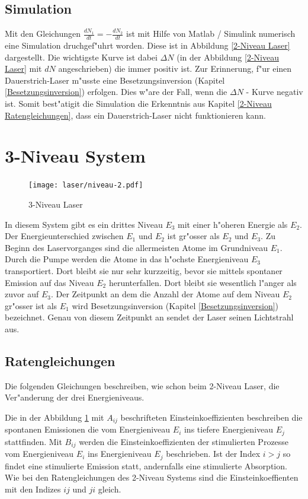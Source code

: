 \begin{refsection}
\subsection{Simulation}
\label{2-Niveau System Simulation}
Mit den Gleichungen  $\frac{dN_1}{dt} = -\frac{dN_2}{dt}$ ist mit Hilfe von
Matlab / Simulink numerisch eine Simulation druchgef"uhrt worden.
Diese ist in Abbildung \ref{2-Niveau Laser}  dargestellt.
Die wichtigste Kurve ist dabei $\Delta N $ 
(in der Abbildung \ref{2-Niveau Laser} mit $dN$ angeschrieben)
die immer positiv ist.
Zur Erinnerung, f"ur einen Dauerstrich-Laser m"usste eine Besetzungsinversion
(Kapitel \ref{Besetzungsinversion}) erfolgen.
Dies w"are der Fall, wenn die $\Delta N $ - Kurve negativ ist.
Somit best"atigit die Simulation die Erkenntnis aus Kapitel
\ref{2-Niveau Ratengleichungen}, dass ein Dauerstrich-Laser nicht
funktionieren kann.

\section{3-Niveau System}
\label{3-Niveau System}

\begin{figure}
\centering
\texttt{[image: laser/niveau-2.pdf]}
\caption{3-Niveau Laser}
\label{3-Niveau Laser}
\end{figure}

In diesem System gibt es ein drittes Niveau $E_3$ mit einer h"oheren Energie
als $E_2$. 
Der Energieunterschied zwischen $E_1$ und $E_2$ ist gr"osser 
als $E_2$ und $E_3$.
Zu Beginn des Laservorganges sind die allermeisten Atome im Grundniveau $E_1$.
Durch die Pumpe werden die Atome in das h"ochste Energieniveau $E_3$
transportiert.
Dort bleibt sie nur sehr kurzzeitig, bevor sie mittels spontaner Emission auf das
Niveau $E_2$ herunterfallen.
Dort bleibt sie wesentlich l"anger als zuvor auf $E_3$.
Der Zeitpunkt an dem die Anzahl der Atome auf dem Niveau $E_2$ gr"osser ist als
$E_1$ wird Besetzungsinversion (Kapitel \ref{Besetzungsinversion}) bezeichnet.
Genau von diesem Zeitpunkt an sendet der Laser seinen Lichtstrahl aus.

\subsection{Ratengleichungen}
\label{3-Niveau Ratengleichungen}
Die folgenden Gleichungen  beschreiben, wie schon beim 2-Niveau Laser, die
Ver"anderung der drei Energieniveaus.

Die in der Abbildung \ref{3-Niveau Laser} mit $A_{ij}$ beschrifteten
Einsteinkoeffizienten beschreiben die spontanen Emissionen die vom
Energieniveau $E_i$ ins tiefere Energieniveau $E_j$ stattfinden.
Mit $B_{ij}$ werden die Einsteinkoeffizienten der stimulierten Prozesse
vom Energieniveau $E_i$ ins Energieniveau $E_j$ beschrieben. 
Ist der Index $i > j$ so findet eine stimulierte Emission statt,
andernfalls eine stimulierte Absorption.
Wie bei den Ratengleichungen des 2-Niveau Systems sind die Einsteinkoeffienten
mit den Indizes $ij$ und $ji$ gleich.



\end{refsection}
